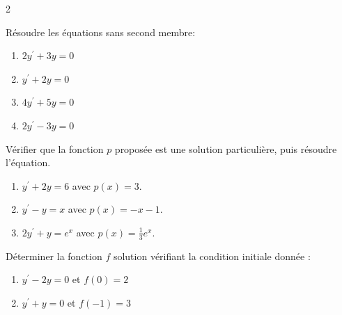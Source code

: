 \def\level{BTS}  %
\def\course{CIEL 2}
\def\chaptername{Equations différentielles} %
\def\docpart{Equations différentielles~--~Exercices} %
\def\docname{C214}        %

\pagestyle{cours_FP}
\makeheaderBTS{} %

\begin{multicols}{2}

		\begin{exercice_cours}[\quad]{}

Résoudre les équations sans second membre:

\begin{enumerate}
  \item $2 y^{\prime}+3 y=0$
  \item $y^{\prime}+2 y=0$
  \item $4 y^{\prime}+5 y=0$
  \item $2 y^{\prime}-3 y=0$
\end{enumerate}

\end{exercice_cours}

		\begin{exercice_cours}[\quad]{}

Vérifier que la fonction $p$ proposée est une solution particulière, puis résoudre l'équation.

\begin{enumerate}
  \item $y^{\prime}+2 y=6$ avec $p(x)=3$.
  \item $y^{\prime}-y=x$ avec $p(x)=-x-1$.
  \item $2 y^{\prime}+y=e^{x}$ avec $p(x)=\frac{1}{3} e^{x}$.
\end{enumerate}
		\end{exercice_cours}

				\begin{exercice_cours}[\quad]{}

		Déterminer la fonction $f$ solution vérifiant la condition initiale donnée :

\begin{enumerate}
  \item $y^{\prime}-2 y=0$ et $f(0)=2$
  \item $y^{\prime}+y=0$ et $f(-1)=3$
\end{enumerate}


		\end{exercice_cours}


\end{multicols}
